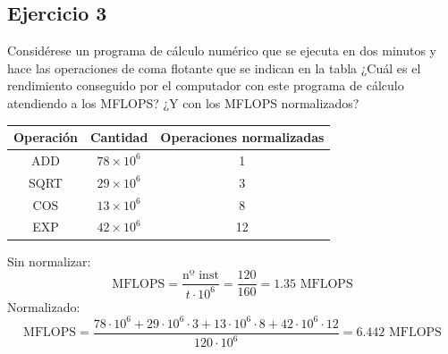 \subsection{Ejercicio 3}
\noindent
Considérese un programa de cálculo numérico que se ejecuta en dos minutos y hace las operaciones de coma flotante que se indican en la tabla ¿Cuál es el rendimiento conseguido por el computador con este programa de cálculo atendiendo a los MFLOPS? ¿Y con los MFLOPS normalizados?
\begin{table}[H]
\centering
\begin{tabular}{|c|c|c|}
\hline
\textbf{Operación} & \textbf{Cantidad} & \textbf{Operaciones normalizadas} \\ \hline
ADD                & $78\times10^6$            & 1                                 \\ \hline
SQRT               & $29\times10^6$            & 3                                 \\ \hline
COS                & $13\times10^6$            & 8                                 \\ \hline
EXP                & $42\times10^6$            & 12                                \\ \hline
\end{tabular}
\end{table}
\begin{tcolorbox}[colback=white,colframe=cyan!50!black,fonttitle=\bfseries]
Sin normalizar:
\[
\text{MFLOPS}=\dfrac{\text{nº inst}}{t\cdot 10^6}=\dfrac{120}{160}=1.35\text{ MFLOPS}
\]
Normalizado:
\[
\text{MFLOPS}=\dfrac{78\cdot 10^6+29\cdot 10^6\cdot 3+13\cdot 10^6\cdot 8+42\cdot 10^6\cdot 12}{120\cdot 10^6}=6.442\text{ MFLOPS}
\]
\end{tcolorbox}
